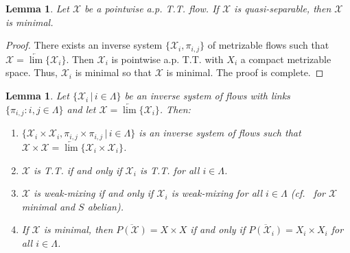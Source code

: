 \documentclass[12pt,final,3p,times]{elsarticle}
\newtheorem{slem}[sthm]{Lemma}
\theoremstyle{definition}
\numberwithin{equation}{section}
\begin{document}
\begin{slem}\label{Q5.7}
Let $\mathscr{X}$ be a pointwise a.p. T.T. flow. If $\mathscr{X}$ is quasi-separable, then $\mathscr{X}$ is minimal.
\end{slem}

\begin{proof}
There exists an inverse system $\{\mathscr{X}_i,\pi_{i,j}\}$ of metrizable flows such that $\mathscr{X}=\underleftarrow{\lim}\{\mathscr{X}_i\}$. Then $\mathscr{X}_i$ is pointwise a.p. T.T. with $X_i$ a compact metrizable space. Thus, $\mathscr{X}_i$ is minimal so that $\mathscr{X}$ is minimal. The proof is complete.
\end{proof}

\begin{slem}\label{Q5.8}
Let $\{\mathscr{X}_i\,|\,i\in\Lambda\}$ be an inverse system of flows with links $\{\pi_{i,j}\colon i,j\in\Lambda\}$ and let $\mathscr{X}=\underleftarrow{\lim}\{\mathscr{X}_i\}$. Then:
\begin{enumerate}[(1)]
\item $\{\mathscr{X}_i\times\mathscr{X}_i, \pi_{i,j}\times\pi_{i,j}\,|\,i\in\Lambda\}$ is an inverse system of flows such that $\mathscr{X}\times\mathscr{X}=\underleftarrow{\lim}\{\mathscr{X}_i\times\mathscr{X}_i\}$.
\item $\mathscr{X}$ is T.T. if and only if $\mathscr{X}_i$ is T.T. for all $i\in\Lambda$.
\item $\mathscr{X}$ is weak-mixing if and only if $\mathscr{X}_i$ is weak-mixing for all $i\in\Lambda$ (cf.~\cite[Lem.~2.5]{K71} for $\mathscr{X}$ minimal and $S$ abelian).
\item If $\mathscr{X}$ is minimal, then $\overline{P(\mathscr{X})}=X\times X$ if and only if $\overline{P(\mathscr{X}_i)}=X_i\times X_i$ for all $i\in\Lambda$.
\end{enumerate}
\end{slem}
\end{document}
